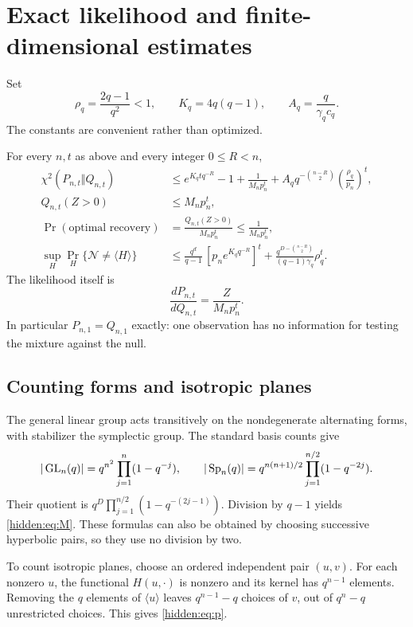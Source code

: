 \section{Exact likelihood and finite-dimensional estimates}

Set
\[
 \rho_q=\frac{2q-1}{q^2}<1,\qquad
 K_q=4q(q-1),\qquad
 A_q=\frac{q}{\gamma_q c_q}.
\]
The constants are convenient rather than optimized.

\begin{proposition}\label{hidden:prop:finite}
For every $n,t$ as above and every integer $0\le R<n$,
\begin{align}
 \chi^2(P_{n,t}\Vert Q_{n,t})
 &\le e^{K_qtq^{-R}}-1+\frac1{M_np_n^t}
       +A_q q^{-\binom{n-R}{2}}\left(\frac{\rho_q}{p_n}\right)^t,
       \label{hidden:eq:finite-chi}\\
 Q_{n,t}(Z>0)&\le M_np_n^t,\label{hidden:eq:null-union}\\
 \Pr(\text{optimal recovery})&=\frac{Q_{n,t}(Z>0)}{M_np_n^t}
                         \le\frac1{M_np_n^t},
                         \label{hidden:eq:Bayes}\\
 \sup_H\Pr_H\{\mathcal N\ne\langle H\rangle\}
 &\le \frac{q^d}{q-1}\,[p_ne^{K_qq^{-R}}]^t
  +\frac{q^{D-\binom{n-R}{2}}}{(q-1)\gamma_q}\rho_q^t.
  \label{hidden:eq:finite-recovery}
\end{align}
The likelihood itself is
\begin{equation}\label{hidden:eq:likelihood}
 \frac{dP_{n,t}}{dQ_{n,t}}=\frac{Z}{M_np_n^t}.
\end{equation}
In particular $P_{n,1}=Q_{n,1}$ exactly: one observation has no information
for testing the mixture against the null.
\end{proposition}

\subsection{Counting forms and isotropic planes}

The general linear group acts transitively on the nondegenerate alternating
forms, with stabilizer the symplectic group. The standard basis counts
give
\[
 |\operatorname{GL}_n(q)|=q^{n^2}\prod_{j=1}^n(1-q^{-j}),\qquad
 |\operatorname{Sp}_n(q)|=q^{n(n+1)/2}\prod_{j=1}^{n/2}(1-q^{-2j}).
\]
Their quotient is
$q^D\prod_{j=1}^{n/2}(1-q^{-(2j-1)})$.
Division by $q-1$ yields \eqref{hidden:eq:M}. These formulas can also be
obtained by choosing successive hyperbolic pairs, so they use no division
by two.

To count isotropic planes, choose an ordered independent pair $(u,v)$.
For each nonzero $u$, the functional $H(u,\cdot)$ is nonzero and its
kernel has $q^{n-1}$ elements. Removing the $q$ elements of $\langle u\rangle$
leaves $q^{n-1}-q$ choices of $v$, out of $q^n-q$ unrestricted choices.
This gives \eqref{hidden:eq:p}.

